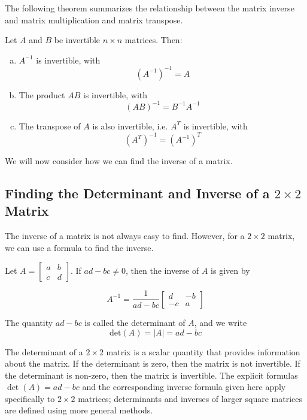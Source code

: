 The following theorem summarizes the relationship between the matrix inverse and matrix multiplication and matrix transpose.

\begin{theorem} Let $A$ and $B$ be invertible $n \times n$ matrices. Then:
\begin{enumerate}[(a)]
    \item $A^{-1}$ is invertible, with
    \[
    \left(A^{-1}\right)^{-1}=A
    \]
    \item The product $A B$ is invertible, with
    \[
    (A B)^{-1}=B^{-1} A^{-1}
    \]
    \item The transpose of $A$ is also invertible, i.e. $A^T$ is invertible, with
    \[
    \left(A^T\right)^{-1}=\left(A^{-1}\right)^T
    \]
\end{enumerate}

\end{theorem}

We will now consider how we can find the inverse of a matrix.

\subsection*{Finding the Determinant and Inverse of a $2 \times 2$ Matrix}

The inverse of a matrix is not always easy to find. However, for a $2 \times 2$ matrix, we can use a formula to find the inverse.

\begin{theorem}
    Let $A=\left[\begin{array}{ll}
    a & b \\
    c & d
    \end{array}\right]$. If $ad-bc \neq 0$, then the inverse of $A$ is given by

    \[
    A^{-1}=\frac{1}{ad-bc}\left[\begin{array}{cc}
    d & -b \\
    -c & a
    \end{array}\right]
    \]
\end{theorem}

\begin{remark}
    The quantity $ad - bc$ is called the determinant of $A$, and we write
    \[
    \text{det}(A) = |A| = ad - bc
    \]
\end{remark}

The determinant of a $2 \times 2$ matrix is a scalar quantity that provides information about the matrix. If the determinant is zero, then the matrix is not invertible. If the determinant is non-zero, then the matrix is invertible. The explicit formulas $\det(A)=ad-bc$ and the corresponding inverse formula given here apply specifically to $2\times2$ matrices; determinants and inverses of larger square matrices are defined using more general methods.

